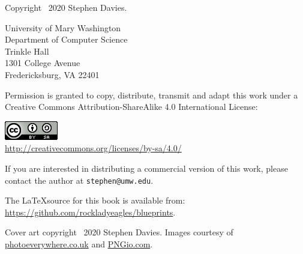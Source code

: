 
\thispagestyle{empty}

Copyright \textcopyright \ 2020 Stephen Davies.

\bigskip

University of Mary Washington\\
Department of Computer Science\\
Trinkle Hall\\
1301 College Avenue\\
Fredericksburg, VA  22401

\vspace{.4in}

Permission is granted to copy, distribute, transmit and adapt this work under a
Creative Commons Attribution-ShareAlike 4.0 International License:

\begin{center}
\includegraphics{cc_license.png}\\
\smallskip
\url{http://creativecommons.org/licenses/by-sa/4.0/}
\end{center}

\vspace{.2in}
If you are interested in distributing a commercial version of this work, please
contact the author at \texttt{stephen@umw.edu}.

\vspace{.4in}
The \LaTeX source for this book is available from:
\url{https://github.com/rockladyeagles/blueprints}.


\vspace{1.8in}
Cover art copyright \textcopyright \ 2020 Stephen Davies.
Images courtesy of \url{photoeverywhere.co.uk} and \url{PNGio.com}.
